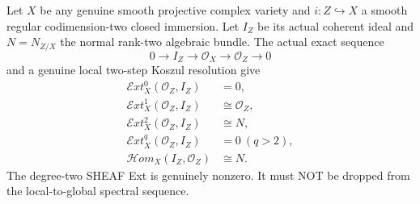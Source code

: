 \documentclass[11pt,a4paper]{article}
\begin{document}
Let \(X\) be any genuine
smooth projective complex
variety and
\(i:Z\hookrightarrow X\)
a smooth regular
codimension-two closed
immersion. Let \(I_Z\)
be its actual coherent
ideal and \(N=N_{Z/X}\)
the normal rank-two
algebraic bundle.
The actual exact
sequence
\[
 0\longrightarrow I_Z
   \longrightarrow\mathcal O_X
   \longrightarrow\mathcal O_Z
   \longrightarrow0
\]
and a genuine local
two-step Koszul
resolution give
\[
 \boxed{
 \begin{aligned}
 \mathcal Ext^0_X(\mathcal O_Z,I_Z)&=0,\\
 \mathcal Ext^1_X(\mathcal O_Z,I_Z)&\cong\mathcal O_Z,\\
 \mathcal Ext^2_X(\mathcal O_Z,I_Z)&\cong N,\\
 \mathcal Ext^q_X(\mathcal O_Z,I_Z)&=0\ (q>2),\\
 \mathcal Hom_X(I_Z,\mathcal O_Z)&\cong N .
 \end{aligned}}                                          \tag{8.1}
\]
The degree-two SHEAF Ext
is genuinely nonzero.
It must NOT be
dropped from the
local-to-global
spectral sequence.
\end{document}
